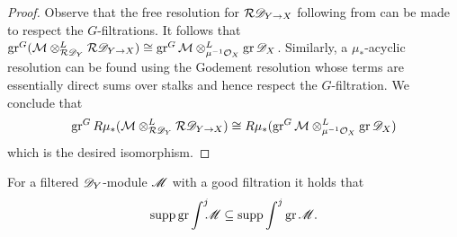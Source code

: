 \begin{proof}
  Observe that the free resolution for $\mathcal{R} \mathscr{D}_{Y\to X}$ following from  can be made to respect the $G$-filtrations.
  It follows that $\operatorname{gr}^G(\mathcal{M}\otimes^L_{\mathcal{R}\mathscr{D}_Y} \mathcal{R}\mathscr{D}_{Y\to X}) \cong \operatorname{gr}^G\mathcal{M}\otimes^L_{\mu^{-1}\mathcal{O}_X}\operatorname{gr}\mathscr{D}_X$.
  Similarly, a $\mu_*$-acyclic resolution can be found using the Godement resolution whose terms are essentially direct sums over stalks and hence respect the $G$-filtration.
  We conclude that
   $$\operatorname{gr}^GR\mu_*(\mathcal{M}\otimes^L_{\mathcal{R}\mathscr{D}_Y} \mathcal{R}\mathscr{D}_{Y\to X})  \cong R\mu_*(\operatorname{gr}^G\mathcal{M}\otimes^L_{\mu^{-1}\mathcal{O}_X}\operatorname{gr}\mathscr{D}_X)$$
  which is the desired isomorphism.


\end{proof}
\begin{proposition}\label{prop: SuppGrrelIntInclusion}
  For a filtered $\mathscr{D}_Y$-module $\mathscr{M}$ with a good filtration it holds that  $$\operatorname{supp} \operatorname{gr}\int^j \mkern -8mu\mathscr{M} \subseteq \operatorname{supp} \int^j \operatorname{gr}\mathscr{M}.$$
\end{proposition}
